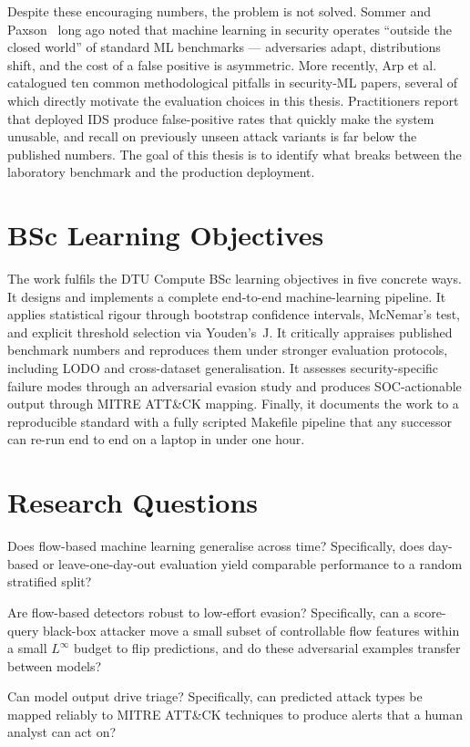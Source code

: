 Despite these encouraging numbers, the problem is not solved. Sommer and
Paxson~\cite{Sommer2010} long ago noted that machine learning in security
operates ``outside the closed world'' of standard ML benchmarks ---
adversaries adapt, distributions shift, and the cost of a false positive
is asymmetric. More recently, Arp et al.~\cite{Arp2022} catalogued ten
common methodological pitfalls in security-ML papers, several of which
directly motivate the evaluation choices in this thesis. Practitioners
report that deployed IDS produce false-positive rates that quickly make
the system unusable, and recall on previously unseen attack variants is
far below the published numbers. The goal of this thesis is to identify
what breaks between the laboratory benchmark and the production deployment.

\section{BSc Learning Objectives}

The work fulfils the DTU Compute BSc learning objectives in five concrete
ways. It designs and implements a complete end-to-end machine-learning
pipeline. It applies statistical rigour through bootstrap confidence
intervals, McNemar's test, and explicit threshold selection via
Youden's~J. It critically appraises published benchmark numbers and
reproduces them under stronger evaluation protocols, including LODO and
cross-dataset generalisation. It assesses security-specific failure modes
through an adversarial evasion study and produces SOC-actionable output
through MITRE ATT\&CK mapping. Finally, it documents the work to a
reproducible standard with a fully scripted Makefile pipeline that any
successor can re-run end to end on a laptop in under one hour.

\section{Research Questions}

\begin{description}[leftmargin=2em, style=nextline]
    \item[RQ1 -- Temporal generalisation.] Does flow-based machine learning generalise across time? Specifically, does day-based or leave-one-day-out evaluation yield comparable performance to a random stratified split?
    \item[RQ2 -- Adversarial robustness.] Are flow-based detectors robust to low-effort evasion? Specifically, can a score-query black-box attacker move a small subset of controllable flow features within a small $L^\infty$ budget to flip predictions, and do these adversarial examples transfer between models?
    \item[RQ3 -- Operational triage.] Can model output drive triage? Specifically, can predicted attack types be mapped reliably to MITRE ATT\&CK techniques to produce alerts that a human analyst can act on?
\end{description}

